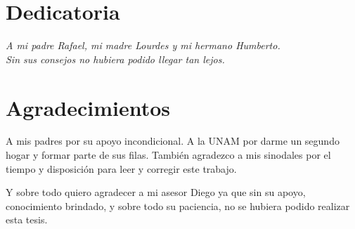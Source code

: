 \documentclass[12pt,a4paper]{book}
\begin{document}
\chapter*{Dedicatoria}

%
\begin{flushright}
\textit{A mi padre Rafael, mi madre Lourdes y mi hermano Humberto. \\Sin sus consejos no hubiera podido llegar tan lejos. \\}
\end{flushright}

%
\chapter*{Agradecimientos} %

A mis padres por su apoyo incondicional. A la UNAM por darme un segundo hogar y formar parte de sus filas. También agradezco a mis sinodales por el
tiempo y disposición para leer y corregir este trabajo. 

Y sobre todo quiero agradecer a mi asesor Diego ya que sin su apoyo, conocimiento brindado, y sobre todo su paciencia, no se hubiera podido realizar esta tesis.

\end{document}
